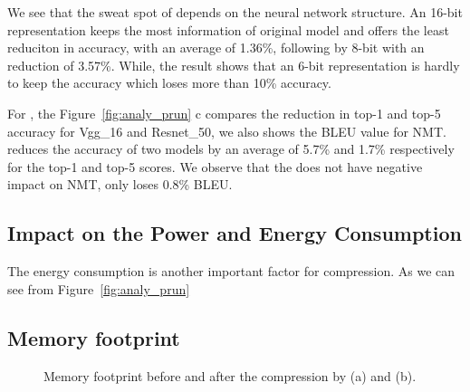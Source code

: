 We see that the sweat spot of \quantization depends on the neural network structure. 
An 16-bit representation keeps the most information of original model and offers the least reduciton in accuracy,
with an average of 1.36\%, following by 8-bit with an reduction of 3.57\%.
While, the result shows that an 6-bit representation is hardly to keep the accuracy which loses more than 10\% accuracy.

For \pruning, the Figure~\ref{fig:analy_prun} c compares the reduction in top-1 and top-5 accuracy for Vgg\_16 and Resnet\_50, 
we also shows the BLEU value for NMT.
\pruning reduces the accuracy of two models by an average of 5.7\% and 1.7\% respectively for the top-1 and top-5 scores.
We observe that the \pruning does not have negative impact on NMT, only loses 0.8\% BLEU. 





\subsection{Impact on the Power and Energy Consumption}
The energy consumption is another important factor for compression.
As we can see from Figure~\ref{fig:analy_prun}

\subsection{Memory footprint}

\begin{figure}[!t]
\centering
{}
\hfill
{}
\hfill

\caption{Memory footprint before and after the compression by \quantization(a) and \pruning (b).}
\label{fig:footprint}
\end{figure}
